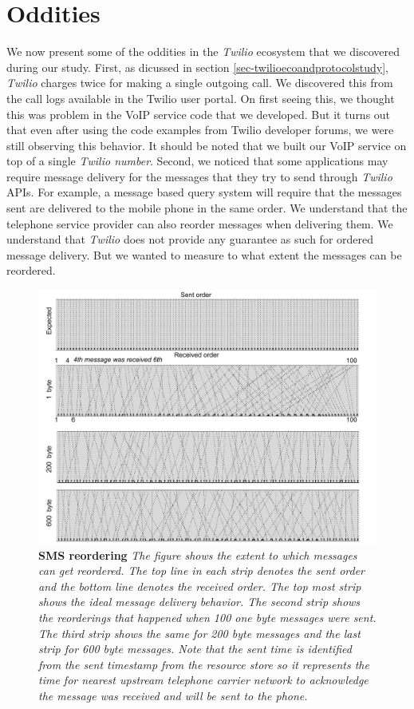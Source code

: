 \section{Oddities}
\label{sec-oddities}

We now present some of the oddities in the \textit{Twilio} ecosystem that we discovered during our study. First, as dicussed in section \ref{sec-twilioecoandprotocolstudy}, \textit{Twilio} charges twice for making a single outgoing call. We discovered this from the call logs available in the Twilio user portal. On first seeing this, we thought this was problem in the VoIP service code that we developed. But it turns out that even after using the code examples from Twilio developer forums, we were still observing this behavior. It should be noted that we built our VoIP service on top of a single \textit{Twilio number}. Second, we noticed that some applications may require  message delivery for the messages that they try to send through \textit{Twilio} APIs. For example, a message based query system will require that the messages sent are delivered to the mobile phone in the same order. We understand that the telephone service provider can also reorder messages when delivering them. We understand that \textit{Twilio} does not provide any guarantee as such for ordered message delivery. But we wanted to measure to what extent the messages can be reordered. 

\begin{figure}[t!] \centering
\includegraphics[width=\textwidth]{figs/reordering.pdf}
\caption{\textbf{SMS reordering} {\footnotesize\textit{
The figure shows the extent to which messages can get reordered. The top line in each strip denotes the sent order and the bottom line denotes the received order. The top most strip shows the ideal message delivery behavior. The second strip shows the reorderings that happened when 100 one byte messages were sent. The third strip shows the same for 200 byte messages and the last strip for 600 byte messages. Note that the sent time is identified from the \textit{sent timestamp} from the resource store so it represents the time for nearest upstream telephone carrier network to acknowledge the message was received and will be sent to the phone. 
}}}
\label{fig:reordering}
\end{figure}


